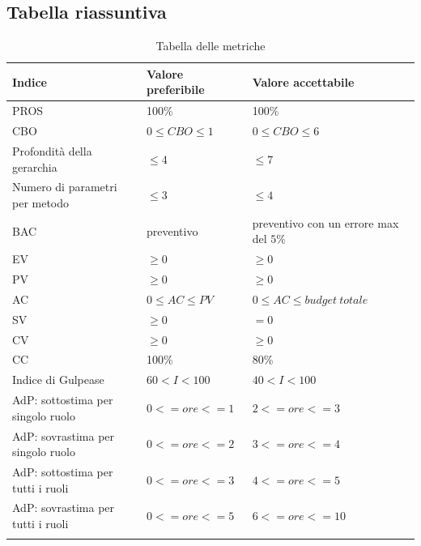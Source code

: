 	\subsection{Tabella riassuntiva}
		\begin{center}
		\begin{longtable}{|C{5cm}|C{5cm}|C{5cm}|}
			\hline
			\textbf{Indice} & \textbf{Valore preferibile} & \textbf{Valore accettabile}  \\ 
						
			\hline
			\endhead
			
			\hline
			PROS & 100\% & 100\% \\
			\hline
			CBO & $0 \leq CBO \leq 1$ & $0 \leq CBO \leq 6$ \\
			\hline
			Profondità della gerarchia & $\leq 4$ & $\leq 7$ \\
			\hline
			Numero di parametri per metodo & $\leq 3$ & $\leq 4$ \\
			\hline
			BAC & preventivo & preventivo con un errore max del $5\%$ \\
			\hline
			EV & $\geq 0$ & $\geq 0$ \\
			\hline
			PV & $\geq 0$ & $\geq 0$ \\			
			\hline
			AC & $0 \leq AC \le PV$ & $0 \leq AC \leq budget \ totale$ \\			
			\hline
			SV & $\ge 0$ & $= 0$ \\			
			\hline
			CV & $\ge 0$ & $\geq 0$ \\		
			\hline
			CC & 100\% & 80\% \\
			\hline
			Indice di Gulpease & $60 < I < 100$ & $40 < I < 100$ \\
			\hline
			AdP: sottostima per singolo ruolo &  $0 <= ore <= 1$ & $2 <= ore <= 3$ \\
			\hline
			AdP: sovrastima per singolo ruolo & $0 <= ore <= 2$ & $3 <= ore <= 4$ \\
			\hline
			AdP: sottostima per tutti i ruoli & $ 0 <= ore <= 3 $ & $ 4 <= ore <= 5 $ \\
			\hline
			AdP: sovrastima per tutti i ruoli & $0 <= ore <= 5$ & $ 6 <= ore <= 10 $ \\
			\hline

			
				
			\hiderowcolors
			\caption{Tabella delle metriche}		
		\end{longtable}	
	\end{center}
	

